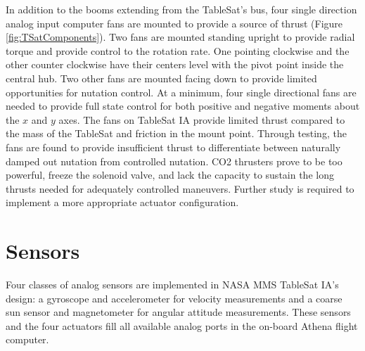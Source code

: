 In addition to the booms extending from the TableSat's bus, four single direction analog input computer fans are mounted to provide a source of thrust (Figure \ref{fig:TSatComponents}).  Two fans are mounted standing upright to provide radial torque and provide control to the rotation rate.  One pointing clockwise and the other counter clockwise have their centers level with the pivot point inside the central hub.  Two other fans are mounted facing down to provide limited opportunities for nutation control.  At a minimum, four single directional fans are needed to provide full state control for both positive and negative moments about the $x$ and $y$ axes.  The fans on TableSat IA provide limited thrust compared to the mass of the TableSat and friction in the mount point.  Through testing, the fans are found to provide insufficient thrust to differentiate between naturally damped out nutation from controlled nutation.  CO2 thrusters prove to be too powerful, freeze the solenoid valve, and lack the capacity to sustain the long thrusts needed for adequately controlled maneuvers.  Further study is required to implement a more appropriate actuator configuration.

\section{Sensors}
\label{sec:Sensors}

Four classes of analog sensors are implemented in NASA MMS TableSat IA's design: a gyroscope and accelerometer for velocity measurements and a coarse sun sensor and magnetometer for angular attitude measurements.  These sensors and the four actuators fill all available analog ports in the on-board Athena flight computer.


